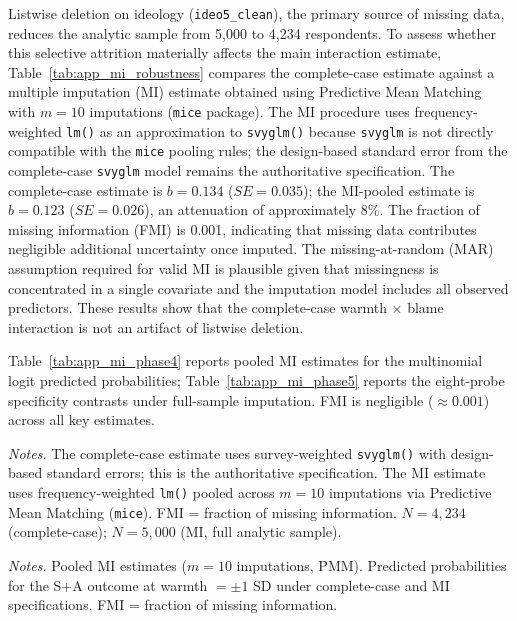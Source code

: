 \documentclass[12pt,letterpaper]{article}
\begin{document}
Listwise deletion on ideology (\texttt{ideo5\_clean}), the primary source of missing data, reduces the analytic sample from 5,000 to 4,234 respondents. To assess whether this selective attrition materially affects the main interaction estimate, Table~\ref{tab:app_mi_robustness} compares the complete-case estimate against a multiple imputation (MI) estimate obtained using Predictive Mean Matching with $m = 10$ imputations (\texttt{mice} package). The MI procedure uses frequency-weighted \texttt{lm()} as an approximation to \texttt{svyglm()} because \texttt{svyglm} is not directly compatible with the \texttt{mice} pooling rules; the design-based standard error from the complete-case \texttt{svyglm} model remains the authoritative specification. The complete-case estimate is $b = 0.134$ ($SE = 0.035$); the MI-pooled estimate is $b = 0.123$ ($SE = 0.026$), an attenuation of approximately 8\%. The fraction of missing information (FMI) is 0.001, indicating that missing data contributes negligible additional uncertainty once imputed. The missing-at-random (MAR) assumption required for valid MI is plausible given that missingness is concentrated in a single covariate and the imputation model includes all observed predictors. These results show that the complete-case warmth $\times$ blame interaction is not an artifact of listwise deletion.

Table~\ref{tab:app_mi_phase4} reports pooled MI estimates for the multinomial logit predicted probabilities; Table~\ref{tab:app_mi_phase5} reports the eight-probe specificity contrasts under full-sample imputation. FMI is negligible ($\approx 0.001$) across all key estimates.

\begin{table}[htbp]
\centering
\small
\caption{Multiple Imputation Robustness: Warmth $\times$ Blame Interaction Coefficient}
\label{tab:app_mi_robustness}
\footnotesize

\par\vspace{0.5ex}
{\footnotesize\textit{Notes.} The complete-case estimate uses survey-weighted \texttt{svyglm()} with design-based standard errors; this is the authoritative specification. The MI estimate uses frequency-weighted \texttt{lm()} pooled across $m = 10$ imputations via Predictive Mean Matching (\texttt{mice}). FMI = fraction of missing information. $N = 4{,}234$ (complete-case); $N = 5{,}000$ (MI, full analytic sample).}
\end{table}

\begin{table}[htbp]
\centering
\small
\caption{Multiple Imputation Robustness: Multinomial Logit Predicted Probabilities}
\label{tab:app_mi_phase4}

\par\vspace{0.5ex}
{\footnotesize\textit{Notes.} Pooled MI estimates ($m = 10$ imputations, PMM). Predicted probabilities for the S+A outcome at warmth $= \pm 1$ SD under complete-case and MI specifications. FMI = fraction of missing information.}
\end{table}
\end{document}
